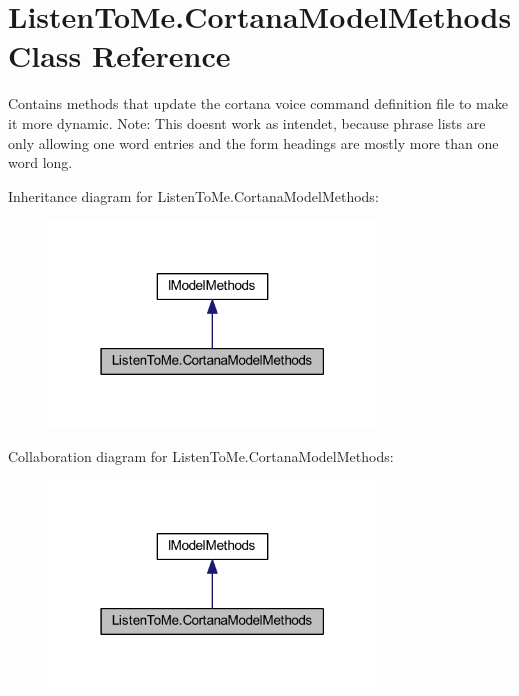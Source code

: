 \hypertarget{class_listen_to_me_1_1_cortana_model_methods}{}\section{Listen\+To\+Me.\+Cortana\+Model\+Methods Class Reference}
\label{class_listen_to_me_1_1_cortana_model_methods}


Contains methods that update the cortana voice command definition file to make it more dynamic. Note\+: This doesn\textquotesingle{}t work as intendet, because phrase lists are only allowing one word entries and the form headings are mostly more than one word long.  




Inheritance diagram for Listen\+To\+Me.\+Cortana\+Model\+Methods\+:
\nopagebreak
\begin{figure}[H]
\begin{center}
\leavevmode
\includegraphics[width=247pt]{class_listen_to_me_1_1_cortana_model_methods__inherit__graph}
\end{center}
\end{figure}


Collaboration diagram for Listen\+To\+Me.\+Cortana\+Model\+Methods\+:
\nopagebreak
\begin{figure}[H]
\begin{center}
\leavevmode
\includegraphics[width=247pt]{class_listen_to_me_1_1_cortana_model_methods__coll__graph}
\end{center}
\end{figure}
